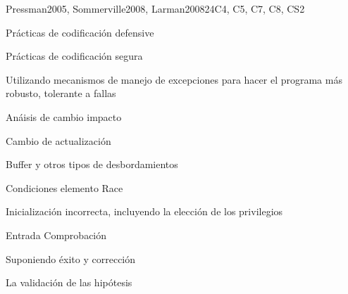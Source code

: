\begin{syllabus}
\begin{unit}{\SESoftwareConstruction}{}{Pressman2005, Sommerville2008, Larman2008}{24}{C4, C5, C7, C8, CS2}
	\begin{topics}
		\item \SESoftwareConstructionTopicCoding
		\begin{subtopic}
			\item Prácticas de codificación defensive
			\item Prácticas de codificación segura
			\item Utilizando mecanismos de manejo de excepciones para hacer el programa más robusto, tolerante a fallas
		\end{subtopic}
		\item \SESoftwareConstructionTopicCodingStandards
		\item \SESoftwareConstructionTopicIntegration
		\item \SESoftwareConstructionTopicDevelopment
		\begin{subtopic} 
			\item Anáisis de cambio impacto 
			\item Cambio de actualización 
		\end{subtopic}
		\item \SESoftwareConstructionTopicPotential
		\begin{subtopic} 
			\item Buffer y otros tipos de desbordamientos 
			\item Condiciones elemento Race 
			\item Inicialización incorrecta, incluyendo la elección de los privilegios 
			\item Entrada Comprobación 
			\item Suponiendo éxito y corrección 
			\item La validación de las hipótesis 
		\end{subtopic}
	\end{topics}
	\begin{learningoutcomes}
		\item \SESoftwareConstructionLODescribeTechniques[\Assessment]
		\item \SESoftwareConstructionLOBuild[\Assessment]
		\item \SESoftwareConstructionLODescribeSecure[\Assessment]
		\item \SESoftwareConstructionLOSelectAndDefined[\Assessment]
		\item \SESoftwareConstructionLOCompareAndStrategies[\Assessment]
		\item \SESoftwareConstructionLODescribeTheAnalyzing[\Assessment]
		\item \SESoftwareConstructionLODescribeTheAnalyzingChanges[\Assessment]
		\item \SESoftwareConstructionLORewrite[\Assessment]
		\item \SESoftwareConstructionLOWriteAThatNon[\Assessment]
	\end{learningoutcomes}
\end{unit}

\begin{coursebibliography}
\end{coursebibliography}

\end{syllabus}

%
